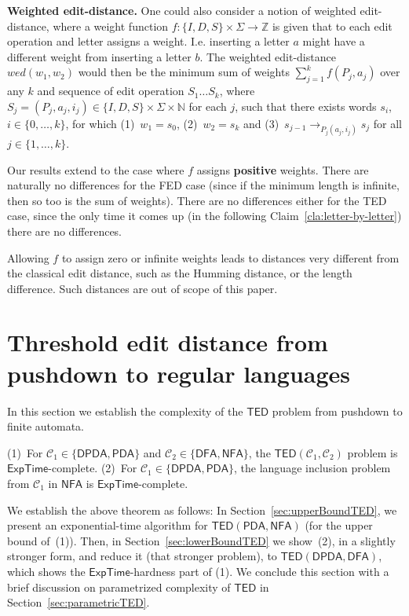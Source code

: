 \documentclass{CSML}
\newcommand{\ZZ}{\mathbb{Z}}
\newcommand{\EXPTIME}{\textsf{ExpTime}}
\newcommand{\class}{\mathcal{C}}
\newcommand{\DFA}{\mathsf{DFA}}
\newcommand{\NFA}{\mathsf{NFA}}
\newcommand{\PDA}{\mathsf{PDA}}
\newcommand{\DPDA}{\mathsf{DPDA}}
\newcommand{\TED}{\mathsf{TED}}
\newcommand{\wed}{wed}
\newcommand{\NN}{\mathbb{N}}
\begin{document}
\begin{rem}
{\bf Weighted edit-distance.} 
One could also consider a notion of weighted edit-distance, where a weight function $f:\{I,D,S\}\times \Sigma\rightarrow \ZZ$ is given that to each edit operation and letter assigns a weight.
I.e. inserting a letter $a$ might have a different weight from inserting a letter $b$.
The weighted edit-distance $\wed(w_1,w_2)$ would then be the minimum sum of weights $\sum_{j=1}^k f(P_j,a_j)$ over any $k$ and sequence of edit operation $S_1\dots S_k$,  
 where $S_j=(P_j,a_j,i_j)\in\{I,D,S\}\times \Sigma\times \NN$ for each $j$, such that there exists words $s_i$, $i\in \{0,\dots,k\}$, for which (1)~$w_1=s_0$, (2)~$w_2=s_k$ and (3)~$s_{j-1}\rightarrow_{P_j(a_j,i_j)}s_{j}$  for all $j\in \{1,\dots,k\}$.
 
 Our results extend to the case where $f$ assigns {\bf positive} weights. There are naturally no differences for the FED case (since if the minimum length is infinite, then so too is the sum of weights). There are no  differences either for the TED case, since the only time it comes up (in the following Claim~\ref{cla:letter-by-letter}) there are no differences.
 
 Allowing $f$ to assign zero or infinite weights leads to distances very different from the classical edit distance, such as the Humming distance,
 or the length difference. Such distances are out of scope of this paper.
\end{rem}


 

\section{Threshold edit distance from pushdown to regular languages}
\makeatletter{}\label{s:TEDPDAToRegular}

In this section we establish the complexity of the $\TED$ problem
from pushdown to finite automata. 

\begin{thm}
(1)~For $\class_1 \in \{\DPDA,\PDA\}$ and $\class_2 \in \{\DFA,\NFA\}$, the $\TED(\class_1, \class_2)$ problem  is $\EXPTIME$-complete.
(2)~For $\class_1 \in \{\DPDA,\PDA\}$, the language inclusion problem from $\class_1$ in $\NFA$ is $\EXPTIME$-complete.
\label{th:mainTED}
\end{thm}

We establish the above theorem as follows:
In Section~\ref{sec:upperBoundTED}, we present an exponential-time algorithm 
for $\TED(\PDA,\NFA)$ (for the upper bound of~(1)). 
Then, in Section~\ref{sec:lowerBoundTED} we show~(2), in a slightly stronger form, 
and reduce it (that stronger problem), to $\TED(\DPDA, \DFA)$, which shows the $\EXPTIME$-hardness 
part of (1).
We conclude this section with a brief discussion on parametrized complexity 
of $\TED$ in Section~\ref{sec:parametricTED}.
\end{document}
